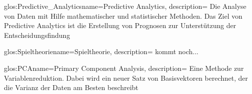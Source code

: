 





\newglossaryentry
{glos:Predictive_Analytics}{name=Predictive Analytics, description=
{Die Analyse von Daten mit Hilfe mathematischer und statistischer Methoden.
Das Ziel von Predictive Analytics ist die Erstellung von Prognosen zur
Unterstützung der Entscheidungsfindung}
}

\newglossaryentry
{glos:Spieltheorie}{name=Spieltheorie, description=
{kommt noch...}
}

\newglossaryentry
{glos:PCA}{name=Primary Component Analysis, description=
{Eine Methode zur Variablenreduktion. Dabei wird ein neuer Satz von
Basisvektoren berechnet, der die Varianz der Daten am Besten beschreibt}
}
